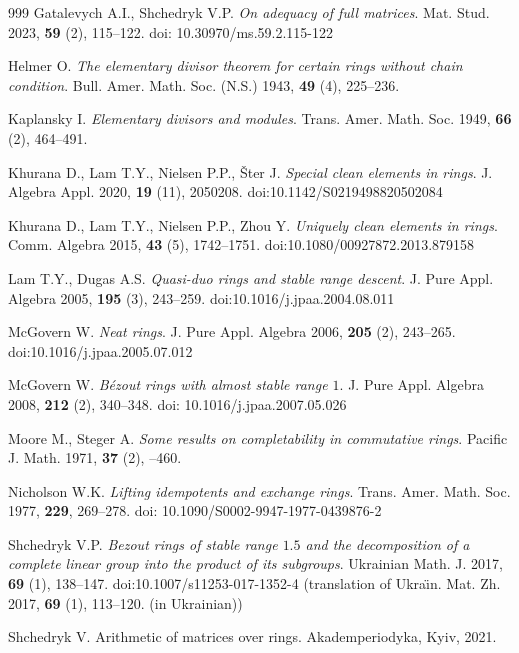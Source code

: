 \documentclass[12pt,a4paper, reqno]{amsart}
\begin{document}
\begin{thebibliography}{999}
Gatalevych A.I., Shchedryk V.P. \textit{On adequacy of full matrices}.
Mat. Stud. 2023, \textbf{59} (2), 115--122.
doi: 10.30970/ms.59.2.115-122

Helmer O. \textit{The elementary divisor theorem for certain rings without chain condition}.
Bull. Amer. Math. Soc. (N.S.) 1943, \textbf{49} (4), 225--236.

Kaplansky I. \textit{Elementary divisors and modules}.
Trans. Amer. Math. Soc. 1949, \textbf{66} (2), 464--491.

Khurana D., Lam T.Y., Nielsen P.P., \v{S}ter J. \textit{Special clean elements in rings}.
J. Algebra Appl. 2020, \textbf{19} (11), 2050208.
doi:10.1142/S0219498820502084

Khurana D., Lam T.Y., Nielsen P.P., Zhou Y. \textit{Uniquely clean elements in rings}.
Comm. Algebra 2015, \textbf{43} (5), 1742--1751.
doi:10.1080/00927872.2013.879158

Lam T.Y., Dugas A.S. \textit{Quasi-duo rings and stable range descent}.
J. Pure Appl. Algebra 2005, \textbf{195} (3), 243--259.
doi:10.1016/j.jpaa.2004.08.011

McGovern W. \textit{Neat rings}.
J. Pure Appl. Algebra 2006, \textbf{205} (2), 243--265.
doi:10.1016/j.jpaa.2005.07.012

McGovern W. \textit{B\'ezout rings with almost stable range $1$}.
J. Pure Appl. Algebra 2008, \textbf{212} (2), 340--348.
doi: 10.1016/j.jpaa.2007.05.026

Moore M., Steger A. \textit{Some results on completability in commutative rings}.
Pacific J. Math. 1971, \textbf{37} (2), --460.

Nicholson W.K. \textit{Lifting idempotents and exchange rings}.
Trans. Amer. Math. Soc. 1977, \textbf{229}, 269--278.
doi: 10.1090/S0002-9947-1977-0439876-2

Shchedryk V.P. \textit{Bezout rings of stable range $1.5$ and the decomposition of a complete linear group into the product of its subgroups}.
Ukrainian Math. J. 2017, \textbf{69} (1), 138--147. doi:10.1007/s11253-017-1352-4
(translation of Ukra\"{\i}n. Mat. Zh. 2017, \textbf{69} (1), 113--120. (in Ukrainian))

Shchedryk V. Arithmetic of matrices over rings.
Akademperiodyka, Kyiv, 2021. %


\end{thebibliography}
\end{document}
